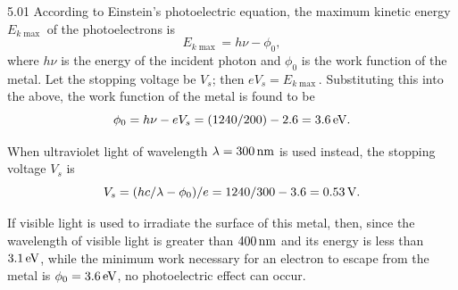 \begin{solution}{5.01}
According to Einstein's photoelectric equation, the maximum kinetic energy $E_{k\max}$ of the
photoelectrons is
\begin{equation*}
E_{k\max} = h\nu - \phi_0,
\end{equation*}
where $h\nu$ is the energy of the incident photon and $\phi_0$ is the work function of the
metal. Let the stopping voltage be $V_s$; then $eV_s = E_{k\max}$. Substituting this into the
above, the work function of the metal is found to be
\begin{equation*}
\phi_0 = h\nu - eV_s = (1240/200) - 2.6 = 3.6\,\mathrm{eV}.
\end{equation*}

When ultraviolet light of wavelength $\lambda = 300\,\mathrm{nm}$ is used instead, the stopping
voltage $V_s$ is
\begin{equation*}
V_s = (hc/\lambda - \phi_0)/e = 1240/300 - 3.6 = 0.53\,\mathrm{V}.
\end{equation*}

If visible light is used to irradiate the surface of this metal, then, since the wavelength of
visible light is greater than $400\,\mathrm{nm}$ and its energy is less than $3.1\,\mathrm{eV}$,
while the minimum work necessary for an electron to escape from the metal is
$\phi_0 = 3.6\,\mathrm{eV}$, no photoelectric effect can occur.
\end{solution}

